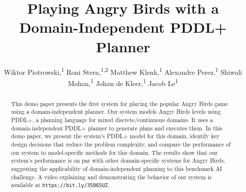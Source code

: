 \documentclass[letterpaper]{article} %
\title{Playing Angry Birds with a Domain-Independent PDDL+ Planner}
\author{
    Wiktor Piotrowski,\textsuperscript{\rm 1}
    Roni Stern,\textsuperscript{\rm 1,2}
    Matthew Klenk,\textsuperscript{\rm 1}
    Alexandre Perez,\textsuperscript{\rm 1}
    Shiwali Mohan,\textsuperscript{\rm 1} 
    Johan de Kleer,\textsuperscript{\rm 1}
    Jacob Le\textsuperscript{\rm 1} 
    \\
}
\begin{document}
\maketitle

\begin{abstract}
This demo paper presents the first system for playing  the popular Angry Birds game using a domain-independent planner. 
Our system models Angry Birds levels using PDDL+, a planning language for mixed discrete/continuous domains. It uses a domain-independent PDDL+ planner to generate plans and executes them. 
In this demo paper, we present the system's PDDL+ model for this domain, identify key design decisions that reduce the problem complexity, and compare the performance of our system to model-specific methods for this domain. The results show that our system's performance is on par with other domain-specific systems for Angry Birds, suggesting the applicability of domain-independent planning to this benchmark AI challenge. 
A video explaining and demonstrating the behavior of our system is available at \texttt{https://bit.ly/35065UZ}. 
\end{abstract}




\end{document}
